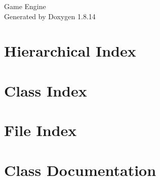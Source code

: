 \documentclass[twoside]{book}
\newcommand{\+}{\discretionary{\mbox{\scriptsize$\hookleftarrow$}}{}{}}
\newcommand{\clearemptydoublepage}{%
  \newpage{\pagestyle{empty}\cleardoublepage}%
}
\begin{document}
\hypersetup{pageanchor=false,
             bookmarksnumbered=true,
             pdfencoding=unicode
            }
\begin{titlepage}
\vspace*{7cm}
\begin{center}%
{\Large Game Engine }\\
\vspace*{1cm}
{\large Generated by Doxygen 1.8.14}\\
\end{center}
\end{titlepage}
\clearemptydoublepage
{}
\tableofcontents
\clearemptydoublepage
{}
\hypersetup{pageanchor=true}

\chapter{Hierarchical Index}

\chapter{Class Index}

\chapter{File Index}

\chapter{Class Documentation}

























\end{document}
